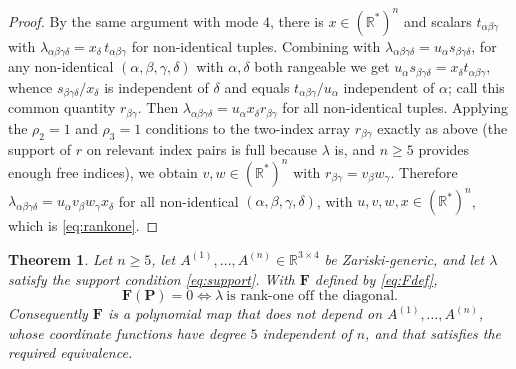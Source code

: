 \documentclass[12pt]{article}
\newcommand{\bR}{\mathbb{R}}
\newtheorem{theorem}{Theorem}
\theoremstyle{definition}
\begin{document}
\begin{proof}
By the same argument with mode $4$, there is $x\in(\bR^*)^n$ and scalars
$t_{\alpha\beta\gamma}$ with $\lambda_{\alpha\beta\gamma\delta}=x_\delta\,t_{\alpha\beta\gamma}$
for non-identical tuples.  Combining with $\lambda_{\alpha\beta\gamma\delta}=u_\alpha
s_{\beta\gamma\delta}$, for any non-identical $(\alpha,\beta,\gamma,\delta)$ with
$\alpha,\delta$ both rangeable we get
$u_\alpha s_{\beta\gamma\delta}=x_\delta t_{\alpha\beta\gamma}$, whence
$s_{\beta\gamma\delta}/x_\delta$ is independent of $\delta$ and equals
$t_{\alpha\beta\gamma}/u_\alpha$ independent of $\alpha$; call this common quantity
$r_{\beta\gamma}$.  Then $\lambda_{\alpha\beta\gamma\delta}=u_\alpha x_\delta
r_{\beta\gamma}$ for all non-identical tuples.  Applying the $\rho_2=1$ and
$\rho_3=1$ conditions to the two-index array $r_{\beta\gamma}$ exactly as above (the
support of $r$ on relevant index pairs is full because $\lambda$ is, and $n\ge5$
provides enough free indices), we obtain $v,w\in(\bR^*)^n$ with
$r_{\beta\gamma}=v_\beta w_\gamma$.  Therefore
$\lambda_{\alpha\beta\gamma\delta}=u_\alpha v_\beta w_\gamma x_\delta$ for all
non-identical $(\alpha,\beta,\gamma,\delta)$, with $u,v,w,x\in(\bR^*)^n$, which is
\eqref{eq:rankone}.
\end{proof}

\begin{theorem}\label{thm:main}
Let $n\ge5$, let $A^{(1)},\dots,A^{(n)}\in\bR^{3\times4}$ be Zariski-generic, and let
$\lambda$ satisfy the support condition \eqref{eq:support}.  With $\mathbf F$ defined
by \eqref{eq:Fdef},
\[
\mathbf F(\mathbf P)=0
\iff
\lambda\ \text{is rank-one off the diagonal.}
\]
Consequently $\mathbf F$ is a polynomial map that does not depend on
$A^{(1)},\dots,A^{(n)}$, whose coordinate functions have degree $5$ independent of
$n$, and that satisfies the required equivalence.
\end{theorem}
\end{document}
